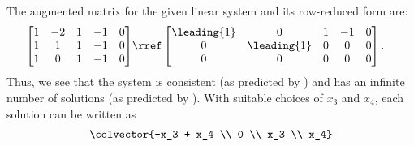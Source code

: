 The augmented matrix for the given linear system and its row-reduced form are:
\begin{align*}
\begin{bmatrix}
1 & -2 & 1 & -1 & 0\\
1 & 1 & 1 & -1 & 0\\
1 & 0 & 1 & -1 & 0
\end{bmatrix}
&\rref
\begin{bmatrix}
\leading{1} & 0 & 1 & -1 & 0\\
0 & \leading{1} & 0 & 0 & 0\\
0 & 0  & 0 & 0 & 0
\end{bmatrix}.
\end{align*}
Thus, we see that the system is consistent (as predicted by ) and has an infinite number of solutions (as predicted by ).  With suitable choices of $x_3$ and $x_4$, each solution can be written as 
%
\begin{align*}
\colvector{-x_3 + x_4 \\ 0 \\ x_3 \\ x_4}
\end{align*}
%